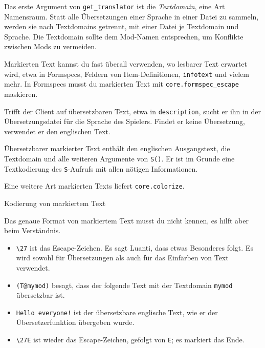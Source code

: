 Das erste Argument von \texttt{get\_\allowbreak{}translator} ist die
\emph{Textdomain}, eine Art
Namensraum. Statt alle Übersetzungen einer
Sprache in einer Datei zu sammeln, werden sie nach Textdomains getrennt,
mit einer Datei je Textdomain und Sprache. Die Textdomain sollte dem
Mod-Namen entsprechen, um Konflikte zwischen Mods zu vermeiden.

Markierten Text kannst du fast überall verwenden, wo lesbarer Text
erwartet wird, etwa in Formspecs, Feldern von
Item-Definitionen, \texttt{infotext} und vielem mehr. In Formspecs musst
du markierten Text mit
\texttt{core.\allowbreak{}formspec\_\allowbreak{}escape}
maskieren.

Trifft der Client auf übersetzbaren Text, etwa in \texttt{description},
sucht er ihn in der Übersetzungsdatei für die Sprache des Spielers.
Findet er keine Übersetzung, verwendet er den englischen Text.

Übersetzbarer markierter Text enthält den englischen Ausgangstext, die
Textdomain und alle weiteren Argumente von \texttt{S()}. Er ist im
Grunde eine Textkodierung des \texttt{S}-Aufrufs mit allen nötigen
Informationen.

Eine weitere Art markierten Texts liefert
\texttt{core.\allowbreak{}colorize}.

\begin{hinweis}{Kodierung von markiertem Text}

Das genaue Format von markiertem Text musst du nicht kennen, es hilft
aber beim Verständnis.

\begin{Shaded}
\begin{Highlighting}[]
\end{Highlighting}
\end{Shaded}

\begin{itemize}
\tightlist
\item
  \texttt{\textbackslash{}27} ist das Escape-Zeichen. Es sagt Luanti,
  dass etwas Besonderes folgt. Es wird sowohl für Übersetzungen als auch
  für das Einfärben von Text verwendet.
\item
  \texttt{(T@mymod)} besagt, dass der folgende Text mit der Textdomain
  \texttt{mymod} übersetzbar ist.
\item
  \texttt{Hello everyone!} ist der übersetzbare englische Text, wie er
  der Übersetzerfunktion übergeben wurde.
\item
  \texttt{\textbackslash{}27E} ist wieder das Escape-Zeichen, gefolgt
  von \texttt{E}; es markiert das Ende.
\end{itemize}

\end{hinweis}

